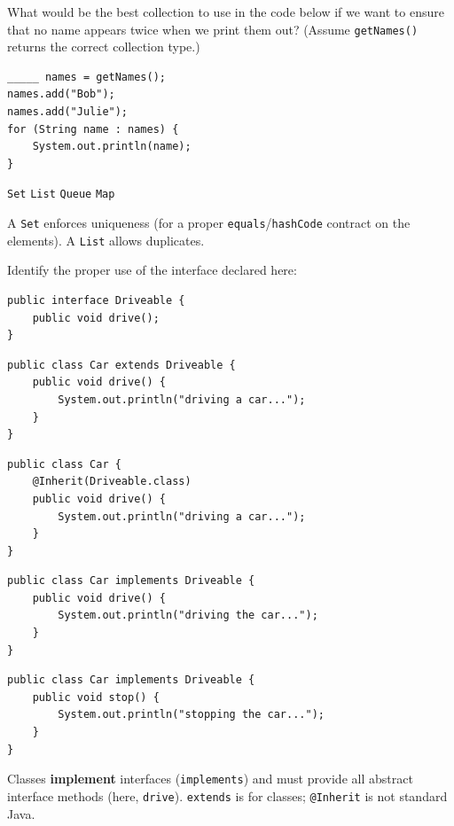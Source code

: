 \question[4]
What would be the best collection to use in the code below if we want to ensure that no name appears twice when we print them out? (Assume \texttt{getNames()} returns the correct collection type.)
\begin{lstlisting}[style=java]
_____ names = getNames();
names.add("Bob");
names.add("Julie");
for (String name : names) {
    System.out.println(name);
}
\end{lstlisting}
\begin{choices}
  \CorrectChoice \texttt{Set}
  \choice \texttt{List}
  \choice \texttt{Queue}
  \choice \texttt{Map}
\end{choices}
\begin{solution}
  A \texttt{Set} enforces uniqueness (for a proper \texttt{equals}/\texttt{hashCode} contract on the elements). A \texttt{List} allows duplicates.
\end{solution}

\newpage

\question[4]
Identify the proper use of the interface declared here:
\begin{lstlisting}[style=java]
public interface Driveable {
    public void drive();
}
\end{lstlisting}
\begin{choices}
  \choice
  \begin{minipage}[t]{0.88\linewidth}
\begin{lstlisting}[style=java]
public class Car extends Driveable {
    public void drive() {
        System.out.println("driving a car...");
    }
}
\end{lstlisting}
  \end{minipage}
  \choice
  \begin{minipage}[t]{0.88\linewidth}
\begin{lstlisting}[style=java]
public class Car {
    @Inherit(Driveable.class)
    public void drive() {
        System.out.println("driving a car...");
    }
}
\end{lstlisting}
  \end{minipage}
  \CorrectChoice
  \begin{minipage}[t]{0.88\linewidth}
\begin{lstlisting}[style=java]
public class Car implements Driveable {
    public void drive() {
        System.out.println("driving the car...");
    }
}
\end{lstlisting}
  \end{minipage}
  \choice
  \begin{minipage}[t]{0.88\linewidth}
\begin{lstlisting}[style=java]
public class Car implements Driveable {
    public void stop() {
        System.out.println("stopping the car...");
    }
}
\end{lstlisting}
  \end{minipage}
\end{choices}
\begin{solution}
  Classes \textbf{implement} interfaces (\texttt{implements}) and must provide all abstract interface methods (here, \texttt{drive}). \texttt{extends} is for classes; \texttt{@Inherit} is not standard Java.
\end{solution}

